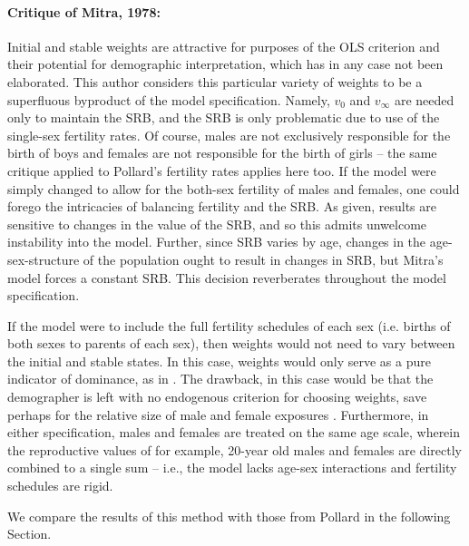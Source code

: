 \paragraph{Critique of Mitra, 1978: } Initial and stable weights are attractive
for purposes of the OLS criterion and their potential for demographic interpretation, which has in any
case not been elaborated. This author considers this particular variety of
weights to be a superfluous byproduct of the model specification. Namely, $v_0$
and $v_\infty$ are needed only to maintain the SRB, and the SRB is
only problematic due to use of the single-sex fertility rates. Of course, males
are not exclusively responsible for the birth of boys and females are not 
responsible for the birth of girls -- the same critique applied to Pollard's
fertility rates applies here too. If the model were simply changed to allow for
the both-sex fertility of males and females, one could forego the
intricacies of balancing fertility and the SRB. As given, results are
sensitive to changes in the value of the SRB, and so this admits
unwelcome instability into the model. Further, since SRB varies by age,
changes in the age-sex-structure of the population ought to result in changes in
SRB, but Mitra's model forces a constant SRB. This decision reverberates
throughout the model specification.

If the model were to include the full fertility schedules of each sex (i.e.
births of both sexes to parents of each sex), then weights would not need to
vary between the initial and stable states. In this case, weights would only serve as a pure indicator of
dominance, as in \citet{goodman1967age}. The drawback, in this case would be
that the demographer is left with no endogenous criterion for choosing weights, save
perhaps for the relative size of male and female exposures \citep{mitra1976effect}. 
Furthermore, in either specification, males and females are treated on the same 
age scale, wherein the reproductive values of for example, 20-year old males and
females are directly combined to a single sum -- i.e., the model lacks age-sex
interactions and fertility schedules are rigid. 

We compare the results of this method with those from Pollard in
the following Section.

\FloatBarrier
